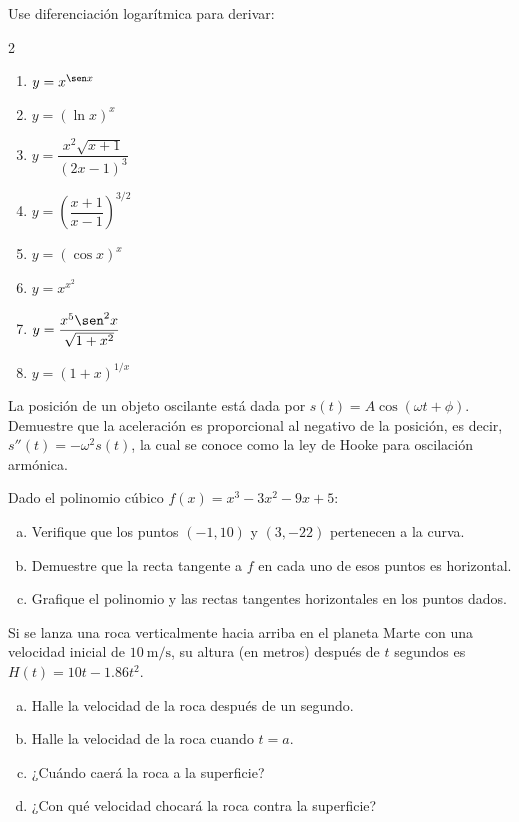 \begin{prob}
Use diferenciación logarítmica para derivar:
\begin{multicols}{2}
\begin{enumerate}
    \item $y = x^{\sen x}$
    \item $y = (\ln x)^x$
    \item $y = \dfrac{x^2\sqrt{x+1}}{(2x-1)^3}$
    \item $y = \left(\dfrac{x+1}{x-1}\right)^{3/2}$
    \item $y = (\cos x)^x$
    \item $y = x^{x^2}$
    \item $y = \dfrac{x^5\sen^2 x}{\sqrt{1+x^2}}$
    \item $y = (1+x)^{1/x}$
\end{enumerate}
\end{multicols}
\end{prob}

\begin{prob}
La posición de un objeto oscilante está dada por $s(t) = A\cos(\omega t+\phi)$.
Demuestre que la aceleración es proporcional al negativo de la posición,
es decir, $s''(t) = -\omega^2 s(t)$, la cual se conoce como la ley de Hooke
para oscilación armónica.
\end{prob}

\begin{prob}
Dado el polinomio cúbico $f(x) = x^3 - 3x^2 - 9x + 5$:
\begin{enumerate}[a)]
    \item Verifique que los puntos $(-1, 10)$ y $(3, -22)$ pertenecen a la curva.
    \item Demuestre que la recta tangente a $f$ en cada uno de esos puntos
    es horizontal.
    \item Grafique el polinomio y las rectas tangentes horizontales en los
    puntos dados.
\end{enumerate}
\end{prob}

\begin{prob}
Si se lanza una roca verticalmente hacia arriba en el planeta Marte con
una velocidad inicial de $10~\text{m/s}$, su altura (en metros) después
de $t$ segundos es $H(t) = 10t - 1.86t^2$.
\begin{enumerate}[a)]
    \item Halle la velocidad de la roca después de un segundo.
    \item Halle la velocidad de la roca cuando $t = a$.
    \item ¿Cuándo caerá la roca a la superficie?
    \item ¿Con qué velocidad chocará la roca contra la superficie?
\end{enumerate}
\end{prob}

